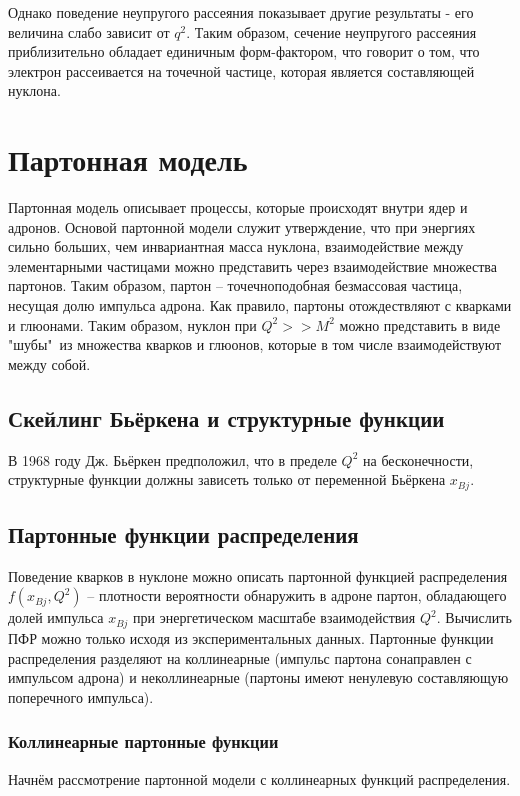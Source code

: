 \documentclass{extarticle}
\begin{document}
Однако поведение неупругого рассеяния показывает другие результаты - его величина слабо зависит от $q^2$. Таким образом, сечение неупругого рассеяния приблизительно обладает единичным форм-фактором, что говорит о том, что электрон рассеивается на точечной частице, которая является составляющей нуклона.



\newpage
\section{Партонная модель}
Партонная модель описывает процессы, которые происходят внутри ядер и адронов. Основой партонной модели служит утверждение, что при энергиях сильно больших, чем инвариантная масса нуклона, взаимодействие между элементарными частицами можно представить через взаимодействие множества партонов. Таким образом, партон -- точечноподобная безмассовая частица, несущая долю импульса адрона. Как правило, партоны отождествляют с кварками и глюонами. 
Таким образом, нуклон при $Q^2 >> M^2$ можно представить в виде "шубы"\ из множества кварков и глюонов, которые в том числе взаимодействуют между собой.
\subsection{Скейлинг Бьёркена и структурные функции}

В 1968 году Дж. Бьёркен предположил, что в пределе $Q^2$ на бесконечности, структурные функции должны зависеть только от переменной Бьёркена $x_{Bj}$.  

\subsection{Партонные функции распределения}
Поведение кварков в нуклоне можно описать партонной функцией распределения $f(x_{Bj},Q^2)$ – плотности вероятности обнаружить в адроне партон, обладающего долей импульса $x_{Bj}$ при энергетическом масштабе взаимодействия $Q^2$. Вычислить ПФР можно только исходя из экспериментальных данных. Партонные функции распределения разделяют на коллинеарные (импульс партона сонаправлен с импульсом адрона) и неколлинеарные (партоны имеют ненулевую составляющую поперечного импульса).
\subsubsection{Коллинеарные партонные функции}
Начнём рассмотрение партонной модели с коллинеарных функций распределения. 
\newpage
\end{document}
